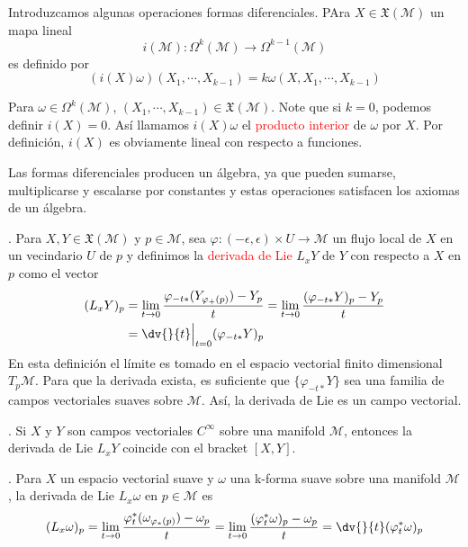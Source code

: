 \documentclass[../main]{subfiles}
\begin{document}
Introduzcamos algunas operaciones formas diferenciales. PAra $X \in \mathfrak{X}(\mathcal{M})$ un mapa lineal 
\begin{equation}
    i(\mathcal{M}): \Omega^k(\mathcal{M}) \rightarrow \Omega^{k-1}(\mathcal{M})
\end{equation}
es definido por 
\begin{equation}
    (i(X)\omega)(X_1, \cdots, X_{k-1})=k\omega(X, X_1, \cdots, X_{k-1})
\end{equation}

Para $\omega \in \Omega^k(\mathcal{M})$, $(X_1, \cdots, X_{k-1}) \in \mathfrak{X}(\mathcal{M})$. Note que si $k=0$, podemos definir $i(X)=0$. Así llamamos $i(X)\omega$ el \textcolor{red}{producto interior} de $\omega$ por $X$. Por definición, $i(X)$ es obviamente lineal con respecto a funciones. 

\proposicion{} Las formas diferenciales producen un álgebra, ya que pueden sumarse, multiplicarse y escalarse por constantes y estas operaciones satisfacen los axiomas de un álgebra.

. Para $X, Y \in \mathfrak{X}(\mathcal{M})$ y $p \in \mathcal{M}$, sea $\varphi: (-\epsilon, \epsilon) \times U \rightarrow \mathcal{M}$ un flujo local de $X$ en un vecindario $U$ de $p$ y definimos la \textcolor{red}{derivada de Lie} $L_x Y$ de $Y$ con respecto a $X$ en $p$ como el vector 
\begin{equation}
    \begin{split}
        (L_x Y)_p&= \lim_{t \rightarrow 0} \dfrac{\varphi_{-t*}(Y_{\varphi_+(p)})-Y_p}{t}=\lim_{t \rightarrow 0} \dfrac{(\varphi_{-t*} Y)_p-Y_p}{t}\\
        &=\dv{}{t}\Big{|}_{t=0}(\varphi_{-t*}Y)_p
    \end{split}
\end{equation}
En esta definición el límite es tomado en el espacio vectorial finito dimensional $T_p \mathcal{M}$. Para que la derivada exista, es suficiente que $\{\varphi_{-t*}Y\}$ sea una familia de campos vectoriales suaves sobre $\mathcal{M}$. Así, la derivada de Lie es un campo vectorial.

\teorema{\textcolor{red}{(Lie Bracket)}}. Si $X$ y $Y$ son campos vectoriales $C^{\infty}$ sobre una manifold $\mathcal{M}$, entonces la derivada de Lie $L_x Y$ coincide con el bracket $[X, Y]$.

. Para $X$ un espacio vectorial suave y $\omega$ una k-forma suave sobre una manifold $\mathcal{M}$, la derivada de Lie $L_x \omega$ en $p\in \mathcal{M}$ es 
\begin{equation}
    (L_x \omega)_p=\lim_{t \rightarrow 0} \dfrac{\varphi^*_t(\omega_{\varphi_*(p)})-\omega_p}{t}=\lim_{t \rightarrow 0}\dfrac{(\varphi^*_t \omega)_p-\omega_p}{t}=\dv{}{t}(\varphi^*_t \omega)_p
\end{equation}
\end{document}
